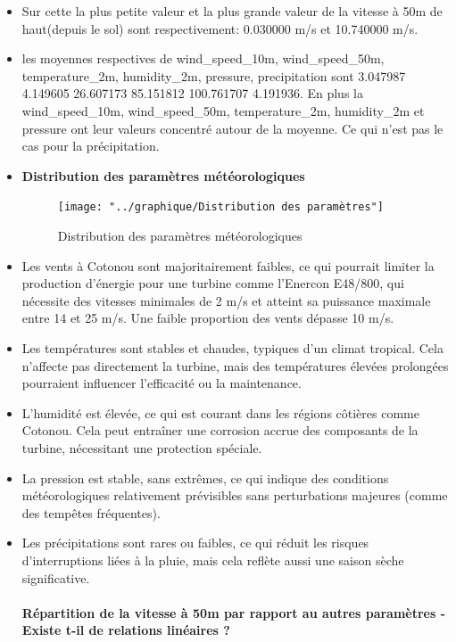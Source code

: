 \documentclass[12pt]{article}
\begin{document}
\begin{itemize}[label=$\color{blue}\diamond$]
\begin{itemize}
		\item Sur cette la plus petite valeur et la plus grande valeur de la vitesse à 50m de haut(depuis le sol) sont respectivement: 0.030000 m/s et 10.740000 m/s.
		\item les moyennes respectives de wind\_speed\_10m, wind\_speed\_50m, temperature\_2m, humidity\_2m, pressure, precipitation sont 3.047987 4.149605 26.607173 85.151812 100.761707 4.191936. En plus la wind\_speed\_10m, wind\_speed\_50m, temperature\_2m, humidity\_2m et pressure ont leur valeurs concentré autour de la moyenne. Ce qui n'est pas le cas pour la précipitation.
		\item \textbf{Distribution des paramètres météorologiques}
		\begin{figure}[H]
			\centering
			\texttt{[image: "../graphique/Distribution des paramètres"]}
			\caption{Distribution des paramètres météorologiques}
			\label{fig:Distribution_paramètres}
		\end{figure}
		\item Les vents à Cotonou sont majoritairement faibles, ce qui pourrait limiter la production d'énergie pour une turbine comme l'Enercon E48/800, qui nécessite des vitesses minimales de 2 m/s et atteint sa puissance maximale entre 14 et 25 m/s. Une faible proportion des vents dépasse 10 m/s.
		\item Les températures sont stables et chaudes, typiques d'un climat tropical. Cela n'affecte pas directement la turbine, mais des températures élevées prolongées pourraient influencer l'efficacité ou la maintenance.
		\item L'humidité est élevée, ce qui est courant dans les régions côtières comme Cotonou. Cela peut entraîner une corrosion accrue des composants de la turbine, nécessitant une protection spéciale.
		\item La pression est stable, sans extrêmes, ce qui indique des conditions météorologiques relativement prévisibles sans perturbations majeures (comme des tempêtes fréquentes).
		\item Les précipitations sont rares ou faibles, ce qui réduit les risques d'interruptions liées à la pluie, mais cela reflète aussi une saison sèche significative.\\\\
		\textbf{Répartition de la vitesse à 50m par rapport au autres paramètres - Existe t-il de relations linéaires ?}
		\begin{figure}[H]
			\centering

\end{figure}
\end{itemize}
\end{itemize}
\end{document}
